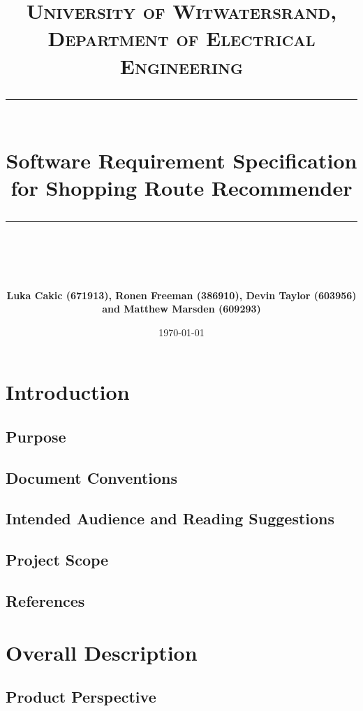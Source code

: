\documentclass[10pt, a4paper, onecolumn]{scrartcl}
\newcommand{\horrule}[1]{\rule{\linewidth}{#1}}
\begin{document}
	
	\title{\normalfont \normalsize
		\textsc{University of Witwatersrand, Department of Electrical Engineering} \\ [10pt]
		\horrule{0.5pt} \\ [10pt]
		\huge Software Requirement Specification for Shopping Route Recommender \\
		\horrule{2pt} \\ [10pt]}
	\author{\textbf{\normalsize{Luka Cakic (671913), Ronen Freeman (386910), Devin Taylor (603956) and Matthew Marsden (609293)}} \\ [10pt]}
	\date {\normalsize \today}
	
	\maketitle
	
	
	\section{Introduction}
	
		\subsection{Purpose}
		
		\subsection{Document Conventions}
		
		\subsection{Intended Audience and Reading Suggestions}
		
		\subsection{Project Scope}
		
		\subsection{References}
	
	\section{Overall Description}
	
		\subsection{Product Perspective}
		
\end{document}
